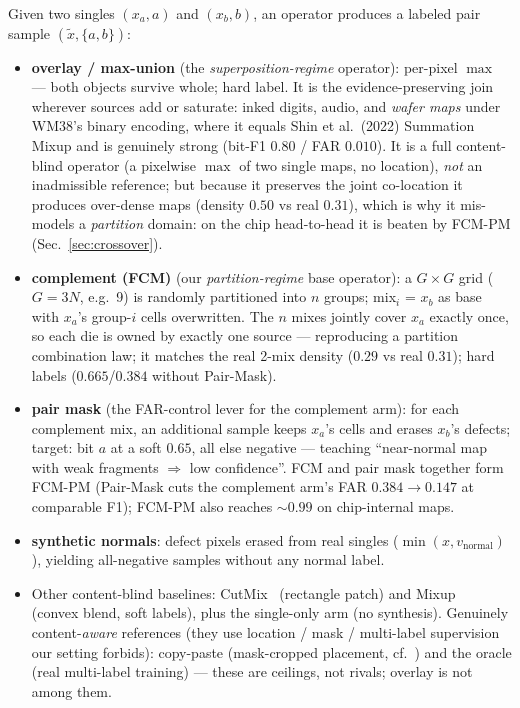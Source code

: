 \documentclass[11pt]{article}
\begin{document}
Given two singles $(x_a, a)$ and $(x_b, b)$, an operator produces a
labeled pair sample $(\tilde{x}, \{a,b\})$:
\begin{itemize}
\item \textbf{overlay / max-union} (the \emph{superposition-regime} operator): per-pixel
  $\max$ --- both objects survive whole; hard label. It is the evidence-preserving join
  wherever sources add or saturate: inked digits, audio, and \emph{wafer maps} under
  WM38's binary encoding, where it equals Shin et al.\ (2022) Summation Mixup and is
  genuinely strong (bit-F1 $0.80$ / FAR $0.010$). It is a full content-blind operator
  (a pixelwise $\max$ of two single maps, no location), \emph{not} an inadmissible
  reference; but because it preserves the joint co-location it produces over-dense maps
  (density $0.50$ vs real $0.31$), which is why it mis-models a \emph{partition}
  domain: on the chip head-to-head it is beaten by FCM-PM (Sec.~\ref{sec:crossover}).
\item \textbf{complement (FCM)} (our \emph{partition-regime} base operator):
  a $G{\times}G$ grid ($G{=}3N$, e.g.\ 9) is randomly partitioned into $n$ groups;
  mix$_i$ = $x_b$ as base with $x_a$'s group-$i$ cells overwritten. The $n$ mixes
  jointly cover $x_a$ exactly once, so each die is owned by exactly one source ---
  reproducing a partition combination law; it matches the real 2-mix density ($0.29$
  vs real $0.31$); hard labels ($0.665$/$0.384$ without Pair-Mask).
\item \textbf{pair mask} (the FAR-control lever for the complement arm): for each
  complement mix, an additional sample keeps $x_a$'s cells and erases $x_b$'s
  defects; target: bit $a$ at a soft $0.65$, all else negative --- teaching
  ``near-normal map with weak fragments $\Rightarrow$ low confidence''. FCM and
  pair mask together form FCM-PM (Pair-Mask cuts the complement arm's FAR
  $0.384 \to 0.147$ at comparable F1); FCM-PM also reaches ${\sim}0.99$ on
  chip-internal maps.
\item \textbf{synthetic normals}: defect pixels erased from real singles
  ($\min(x, v_{\text{normal}})$), yielding all-negative samples without
  any normal label.
\item Other content-blind baselines: CutMix~\cite{yun2019cutmix} (rectangle patch)
  and Mixup~\cite{zhang2018mixup} (convex blend, soft labels), plus the single-only
  arm (no synthesis). Genuinely content-\emph{aware} references (they use location /
  mask / multi-label supervision our setting forbids): copy-paste (mask-cropped
  placement, cf.~\cite{ghiasi2021copypaste}) and the oracle (real multi-label training)
  --- these are ceilings, not rivals; overlay is not among them.
\end{itemize}
\end{document}
